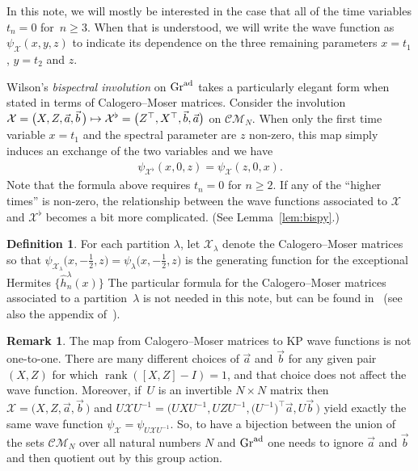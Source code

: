 \documentclass[10pt,a4paper]{amsart}
\numberwithin{equation}{section}
\theoremstyle{definition}
\newtheorem{Definition}[Theorem]{Definition}
\newtheorem{Remark}[Theorem]{Remark}
\def\X{\mathcal{X}}
\def\CM{\mathcal{C\!M}}
\begin{document}
In this note, we will mostly be interested in the case that all of the
time variables $t_n=0$ for~$n\geq 3$.
When that is understood, we will write the wave function as $\psi_{\X}(x,y,z)$ to
indicate its dependence on the three remaining parameters $x=t_1$, $y=t_2$ and $z$.


Wilson's
\textit{bispectral involution} on ${\rm Gr}^{\rm ad}$ \cite{WilsonBisp}
takes a particularly elegant form when stated in terms of Calogero--Moser matrices.
Consider the involution $\X=\bigl(X,Z,\vec a,\vec b\,\bigr)\mapsto\X^{\flat}=\smash{\bigl(Z^{\top},X^{\top},\vec b,\vec a\bigr)}$
on $\CM_N$.
When only the first time variable $x=t_1$ and the
 spectral parameter are $z$ non-zero,
 this map simply induces an exchange of the two variables
 \cite{WilsonCM} and we have%
\begin{gather}
 \psi_{\X^{\flat}}(x,0,z)=\psi_{\X}(z,0,x).\label{eqn:bi0}
\end{gather}
Note that the formula above requires $t_n=0$ for
$n\geq 2$. If any of the ``higher times'' is non-zero, the
relationship between the wave functions associated to $\X$ and
$\X^\flat$ becomes a bit more complicated. (See Lemma~\ref{lem:bispy}.)

 \begin{Definition}
For each partition $\lambda$, let $\X_{\lambda}$ denote the
Calogero--Moser matrices so that $\psi_{\X_{\lambda}}\bigl(x,-\tfrac{1}{2},z\bigr)=\psi_{\lambda}\bigl(x,-\tfrac{1}{2},z\bigr)$ is the
 generating function for the exceptional Hermites $\big\{\hat h_n^{\lambda}(x)\big\}$
The particular formula for the Calogero--Moser matrices associated to a partition~$\lambda$ is not needed in this note,
but can be found in~\cite{PThesis, PalusoKasman} (see also the appendix of~\cite{WilsonCM}).
 \end{Definition}

 \begin{Remark}
 The map from Calogero--Moser matrices to KP wave functions is not
 one-to-one. There are many different choices of $\vec a $ and
 $\vec b$ for any given pair $(X,Z)$ for which ${\operatorname{rank}([X,Z]-I)=1}$,
 and that choice does not affect the wave function. Moreover, if~$U$
 is an invertible $N\times N$ matrix then $\X=\bigl(X,Z,\vec a,\vec b\,\bigr)$ and
 $U\X U^{-1}=\bigl(UXU^{-1},UZU^{-1},\bigl(U^{-1}\bigr)^{\top}\vec a,U\vec b\,\bigr)$ yield exactly the same wave function
 $\psi_{\X}=\psi_{U\X U^{-1}}$. So, to have a
 bijection between the union of the sets $\CM_N$ over all natural
 numbers $N$ and ${\rm Gr}^{\rm ad}$ one needs to ignore $\vec a$ and $\vec
 b$ and then quotient out
 by this group action.
 \end{Remark}
\end{document}
